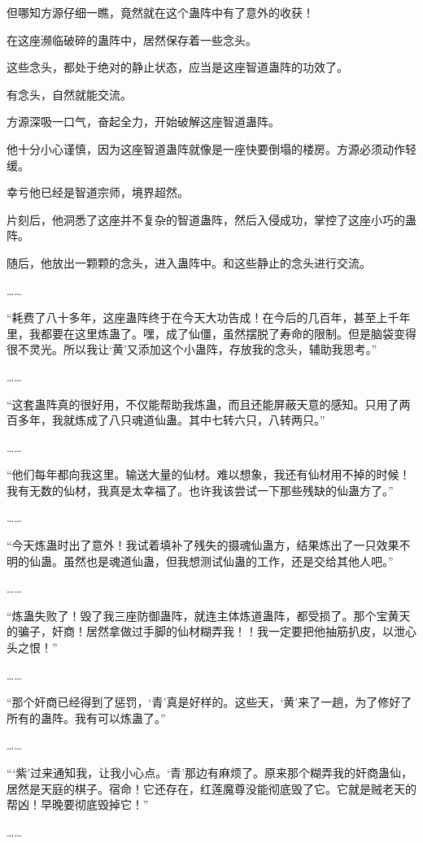 \begin{this_body}
但哪知方源仔细一瞧，竟然就在这个蛊阵中有了意外的收获！

在这座濒临破碎的蛊阵中，居然保存着一些念头。

这些念头，都处于绝对的静止状态，应当是这座智道蛊阵的功效了。

有念头，自然就能交流。

方源深吸一口气，奋起全力，开始破解这座智道蛊阵。

他十分小心谨慎，因为这座智道蛊阵就像是一座快要倒塌的楼房。方源必须动作轻缓。

幸亏他已经是智道宗师，境界超然。

片刻后，他洞悉了这座并不复杂的智道蛊阵，然后入侵成功，掌控了这座小巧的蛊阵。

随后，他放出一颗颗的念头，进入蛊阵中。和这些静止的念头进行交流。

……

“耗费了八十多年，这座蛊阵终于在今天大功告成！在今后的几百年，甚至上千年里，我都要在这里炼蛊了。嘿，成了仙僵，虽然摆脱了寿命的限制。但是脑袋变得很不灵光。所以我让‘黄’又添加这个小蛊阵，存放我的念头，辅助我思考。”

……

“这套蛊阵真的很好用，不仅能帮助我炼蛊，而且还能屏蔽天意的感知。只用了两百多年，我就炼成了八只魂道仙蛊。其中七转六只，八转两只。”

……

“他们每年都向我这里。输送大量的仙材。难以想象，我还有仙材用不掉的时候！我有无数的仙材，我真是太幸福了。也许我该尝试一下那些残缺的仙蛊方了。”

……

“今天炼蛊时出了意外！我试着填补了残失的摄魂仙蛊方，结果炼出了一只效果不明的仙蛊。虽然也是魂道仙蛊，但我想测试仙蛊的工作，还是交给其他人吧。”

……

“炼蛊失败了！毁了我三座防御蛊阵，就连主体炼道蛊阵，都受损了。那个宝黄天的骗子，奸商！居然拿做过手脚的仙材糊弄我！！我一定要把他抽筋扒皮，以泄心头之恨！”

……

“那个奸商已经得到了惩罚，‘青’真是好样的。这些天，‘黄’来了一趟，为了修好了所有的蛊阵。我有可以炼蛊了。”

……

“‘紫’过来通知我，让我小心点。‘青’那边有麻烦了。原来那个糊弄我的奸商蛊仙，居然是天庭的棋子。宿命！它还存在，红莲魔尊没能彻底毁了它。它就是贼老天的帮凶！早晚要彻底毁掉它！”

……


\end{this_body}
